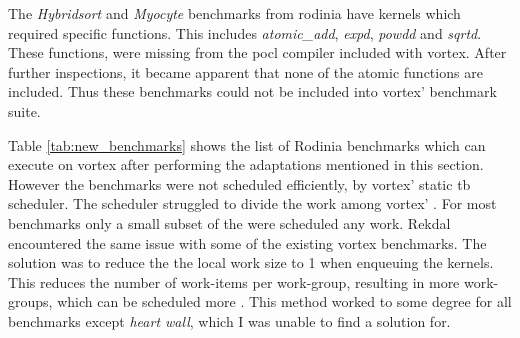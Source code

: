 The \textit{Hybridsort} and \textit{Myocyte} benchmarks from \Gls{rodinia} have kernels which required specific functions. This includes \textit{atomic\_add}, \textit{expd}, \textit{powdd} and \textit{sqrtd}. These functions, were missing from the \Gls{pocl} compiler included with \Gls{vortex}. After further inspections, it became apparent that none of the atomic functions are included. Thus these benchmarks could not be included into \Gls{vortex}' benchmark suite.

Table \ref{tab:new_benchmarks} shows the list of Rodinia benchmarks which can execute on \Gls{vortex} after performing the adaptations mentioned in this section. However the benchmarks were not scheduled efficiently, by \Gls{vortex}' static \acrshort{tb} scheduler. The scheduler struggled to divide the work among \Gls{vortex}' . For most benchmarks only a small subset of the  were scheduled any work. Rekdal \cite{Rekdal_Master} encountered the same issue with some of the existing \Gls{vortex} benchmarks. The solution was to reduce the the local work size to 1 when enqueuing the kernels. This reduces the number of work-items per work-group, resulting in more work-groups, which can be scheduled more . This method worked to some degree for all benchmarks except \textit{heart wall}, which I was unable to find a solution for.  

